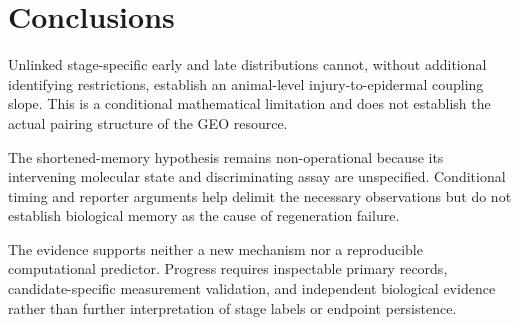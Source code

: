 \documentclass[11pt]{article}
\begin{document}
\section{Conclusions}
Unlinked stage-specific early and late distributions cannot, without additional identifying restrictions, establish an animal-level injury-to-epidermal coupling slope. This is a conditional mathematical limitation and does not establish the actual pairing structure of the GEO resource.

The shortened-memory hypothesis remains non-operational because its intervening molecular state and discriminating assay are unspecified. Conditional timing and reporter arguments help delimit the necessary observations but do not establish biological memory as the cause of regeneration failure.

The evidence supports neither a new mechanism nor a reproducible computational predictor. Progress requires inspectable primary records, candidate-specific measurement validation, and independent biological evidence rather than further interpretation of stage labels or endpoint persistence.

\appendix
\end{document}
